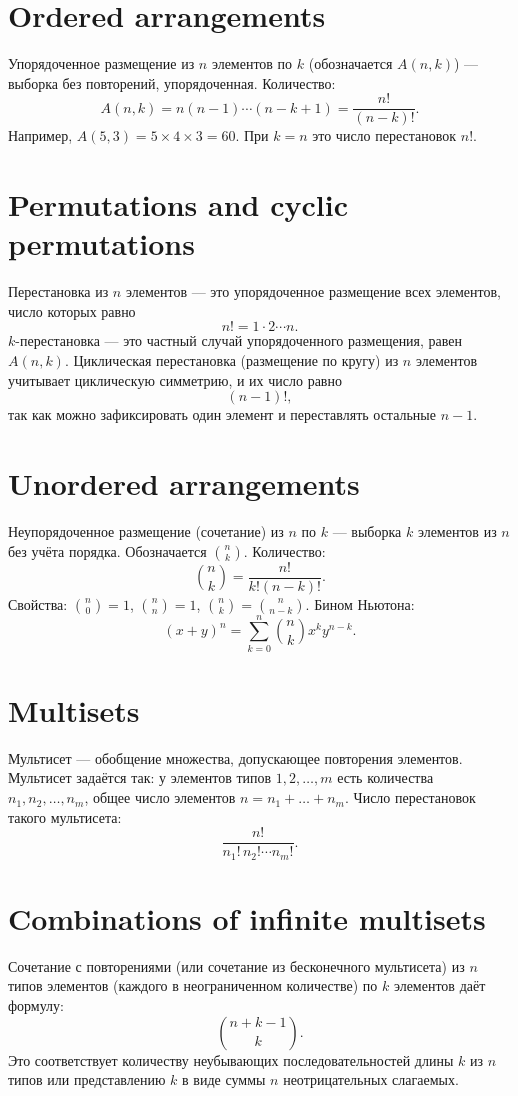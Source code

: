 \documentclass{article}
\begin{document}
	\section{Ordered arrangements}
	Упорядоченное размещение из $n$ элементов по $k$ (обозначается $A(n,k)$) --- выборка без повторений, упорядоченная. Количество:
	\[
	A(n,k) = n(n-1)\cdots(n-k+1) = \frac{n!}{(n-k)!}.
	\]
	Например, $A(5,3) = 5\times4\times3 = 60$. При $k=n$ это число перестановок $n!$.
	
	\section{Permutations and cyclic permutations}
	Перестановка из $n$ элементов --- это упорядоченное размещение всех элементов, число которых равно
	\[
	n! = 1\cdot2\cdots n.
	\]
	$k$-перестановка --- это частный случай упорядоченного размещения, равен $A(n,k)$. Циклическая перестановка (размещение по кругу) из $n$ элементов учитывает циклическую симметрию, и их число равно
	\[
	(n-1)!,
	\]
	так как можно зафиксировать один элемент и переставлять остальные $n-1$.
	
	\section{Unordered arrangements}
	Неупорядоченное размещение (сочетание) из $n$ по $k$ --- выборка $k$ элементов из $n$ без учёта порядка. Обозначается $\displaystyle \binom{n}{k}$. Количество:
	\[
	\binom{n}{k} = \frac{n!}{k!(n-k)!}.
	\]
	Свойства: $\binom{n}{0}=1$, $\binom{n}{n}=1$, $\binom{n}{k} = \binom{n}{n-k}$. Бином Ньютона:
	\[
	(x+y)^n = \sum_{k=0}^n \binom{n}{k} x^k y^{n-k}.
	\]
	
	\section{Multisets}
	Мультисет --- обобщение множества, допускающее повторения элементов. Мультисет задаётся так: у элементов типов $1,2,\dots,m$ есть количества $n_1,n_2,\dots,n_m$, общее число элементов $n=n_1+\dots +n_m$. Число перестановок такого мультисета:
	\[
	\frac{n!}{n_1!\,n_2!\cdots n_m!}.
	\]
	
	\section{Combinations of infinite multisets}
	Сочетание с повторениями (или сочетание из бесконечного мультисета) из $n$ типов элементов (каждого в неограниченном количестве) по $k$ элементов даёт формулу:
	\[
	\binom{n+k-1}{k}.
	\]
	Это соответствует количеству неубывающих последовательностей длины $k$ из $n$ типов или представлению $k$ в виде суммы $n$ неотрицательных слагаемых.
	
\end{document}
